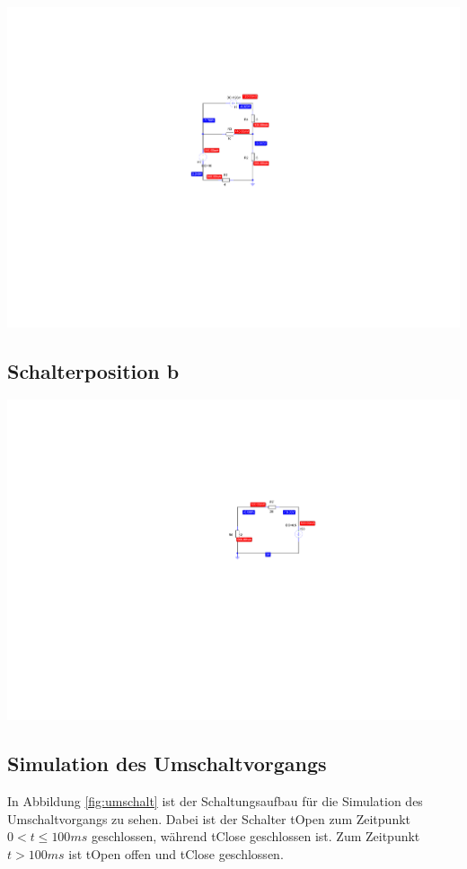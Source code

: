 \documentclass[11pt]{scrartcl}
\begin{document}
\begin{center}
  \includegraphics[scale=1.6]{./Assets/SP_a}
  \label{fig:a}
\end{center}
\newpage

\subsection{Schalterposition b}
\begin{center}
  \includegraphics[scale=1.6]{./Assets/SP_b}
  \label{fig:b}
\end{center}

\newpage
\subsection{Simulation des Umschaltvorgangs}
In Abbildung \ref{fig:umschalt} ist der Schaltungsaufbau für die Simulation des Umschaltvorgangs zu sehen.
Dabei ist der Schalter tOpen zum Zeitpunkt $0 < t \leq 100 \unit{ms}$ geschlossen, während tClose geschlossen ist.
Zum Zeitpunkt $t > 100 \unit{ms}$ ist tOpen offen und tClose geschlossen.
\end{document}
